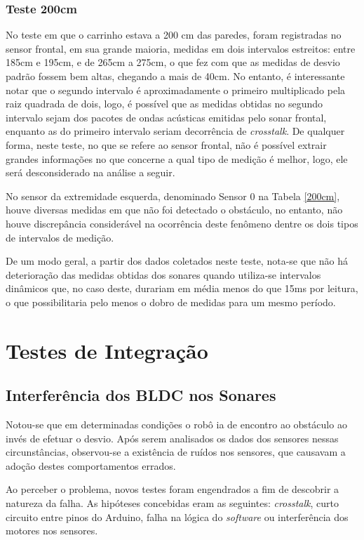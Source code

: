 \subsubsection{Teste 200cm}
No teste em que o carrinho estava a 200 cm das paredes, foram registradas no sensor frontal, em sua grande maioria, medidas em dois intervalos 
estreitos: entre 185cm e 195cm, e de 265cm a 275cm, o que fez com que as medidas de desvio padrão fossem bem altas, chegando a mais de 40cm.
No entanto, é interessante notar que o segundo intervalo é aproximadamente o primeiro multiplicado pela raiz quadrada de dois, logo, é possível que 
as medidas obtidas no segundo intervalo sejam dos pacotes de ondas acústicas emitidas pelo sonar frontal, enquanto as do primeiro intervalo seriam 
decorrência de \textit{crosstalk}.
De qualquer forma, neste teste, no que se refere ao sensor frontal, não é possível extrair grandes informações no que concerne a qual tipo de medição 
é melhor, logo, ele será desconsiderado na análise a seguir.

No sensor da extremidade esquerda, denominado Sensor 0 na Tabela \ref{200cm}, houve diversas medidas em que não foi detectado o obstáculo, no 
entanto, não houve discrepância considerável na ocorrência deste fenômeno dentre os dois tipos de intervalos de medição.

De um modo geral, a partir dos dados coletados neste teste, nota-se que não há deterioração das medidas obtidas dos sonares quando utiliza-se 
intervalos dinâmicos que, no caso deste, durariam em média menos do que 15ms por leitura, o que possibilitaria pelo menos o dobro de medidas 
para um mesmo período.
  

\section{Testes de Integração}
\subsection{Interferência dos BLDC nos Sonares}
Notou-se que em determinadas condições o robô ia de encontro ao obstáculo ao invés de efetuar o desvio. 
Após serem analisados os dados dos sensores nessas circunstâncias, observou-se a existência de ruídos nos sensores, que causavam a adoção 
destes comportamentos errados.

Ao perceber o problema, novos testes foram engendrados a fim de descobrir a natureza da falha.
As hipóteses concebidas eram as seguintes: \textit{crosstalk}, curto circuito entre pinos do Arduino, falha na lógica do \textit{software} ou 
interferência dos motores nos sensores.

